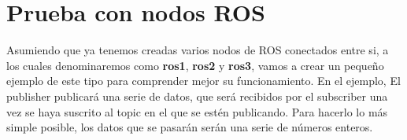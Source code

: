 \chapter{Prueba con nodos ROS}
Asumiendo que ya tenemos creadas varios nodos de ROS conectados entre si, a los cuales denominaremos como \textbf{ros1}, \textbf{ros2} y \textbf{ros3}, vamos a crear un pequeño ejemplo de este tipo para comprender mejor su funcionamiento. En el ejemplo, El publisher publicará una serie de datos, que será recibidos por el subscriber una vez se haya suscrito al topic en el que se estén publicando. Para hacerlo lo más simple posible, los datos que se pasarán serán una serie de números enteros.